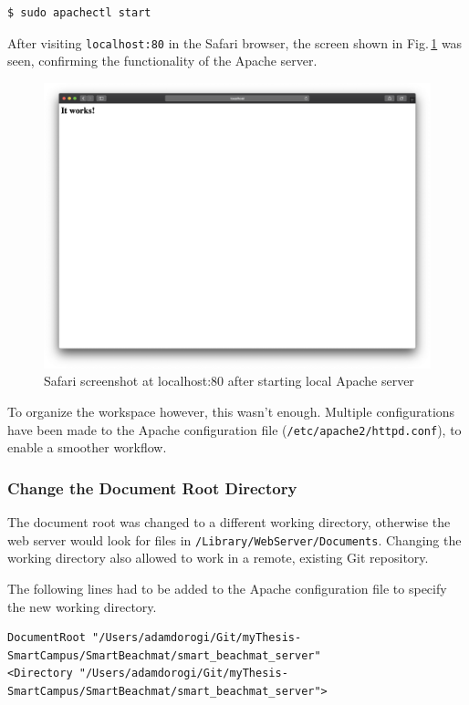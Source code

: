 \documentclass[12pt,openany,a4paper]{book}
\newcommand{\fig}[1]  {Fig.\,\ref{#1}}		%
\begin{document}
\begin{lstlisting}[basicstyle=\ttfamily]
$ sudo apachectl start
\end{lstlisting}

After visiting \verb|localhost:80| in the Safari browser, the screen shown in
\fig{fig:apache_works} was seen, confirming the functionality of the Apache server.

\begin{figure}[h]
\centerline{\includegraphics[width=\textwidth]{ApacheItWorks.png}}
\caption{Safari screenshot at localhost:80 after starting local Apache server}
\label{fig:apache_works}
\end{figure}

To organize the workspace however, this wasn't enough. Multiple configurations have
been made to the Apache configuration file (\verb|/etc/apache2/httpd.conf|), to
enable a smoother workflow.

\subsubsection{Change the Document Root Directory}
The document root was changed to a different working directory,
otherwise the web server would look for files in \verb|/Library/WebServer/Documents|.
Changing the working directory also allowed to work in a remote, existing
Git repository.

The following lines had to be added to the Apache configuration file to specify
the new working directory.

\begin{lstlisting}[basicstyle=\ttfamily,breaklines=true]
DocumentRoot "/Users/adamdorogi/Git/myThesis-SmartCampus/SmartBeachmat/smart_beachmat_server"
<Directory "/Users/adamdorogi/Git/myThesis-SmartCampus/SmartBeachmat/smart_beachmat_server">
\end{lstlisting}
\end{document}
